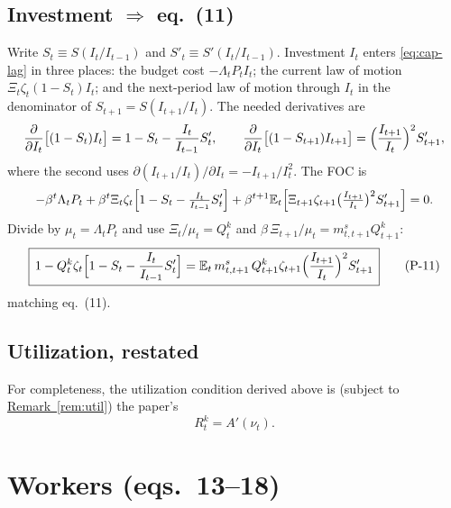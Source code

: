 \subsection{Investment \texorpdfstring{$\Rightarrow$}{=>} eq.\ (11)}
Write $S_t\equiv S(I_t/I_{t-1})$ and $S'_t\equiv S'(I_t/I_{t-1})$. Investment $I_t$ enters
\eqref{eq:cap-lag} in three places: the budget cost $-\Lambda_tP_tI_t$; the current law of motion
$\Xi_t\zeta_t(1-S_t)I_t$; and the next-period law of motion through $I_t$ in the denominator of
$S_{t+1}=S(I_{t+1}/I_t)$. The needed derivatives are
\[
\frac{\partial }{\partial I_t}\big[(1-S_t)I_t\big]=1-S_t-\frac{I_t}{I_{t-1}}S'_t,\qquad
\frac{\partial }{\partial I_t}\big[(1-S_{t+1})I_{t+1}\big]=\Big(\frac{I_{t+1}}{I_t}\Big)^2 S'_{t+1},
\]
where the second uses $\partial(I_{t+1}/I_t)/\partial I_t=-I_{t+1}/I_t^2$. The FOC is
\[
-\beta^t\Lambda_tP_t+\beta^t\Xi_t\zeta_t\Big[1-S_t-\tfrac{I_t}{I_{t-1}}S'_t\Big]
+\beta^{t+1}\mathbb{E}_t\Big[\Xi_{t+1}\zeta_{t+1}\big(\tfrac{I_{t+1}}{I_t}\big)^2 S'_{t+1}\Big]=0.
\]
Divide by $\mu_t=\Lambda_tP_t$ and use $\Xi_t/\mu_t=Q^k_t$ and $\beta\,\Xi_{t+1}/\mu_t=m^s_{t,t+1}Q^k_{t+1}$:
\begin{equation}\label{eq:11}
\boxed{\,1-Q^k_t\zeta_t\Big[1-S_t-\frac{I_t}{I_{t-1}}S'_t\Big]
=\mathbb{E}_t\,m^s_{t,t+1}\,Q^k_{t+1}\zeta_{t+1}\Big(\frac{I_{t+1}}{I_t}\Big)^2 S'_{t+1}\,}
\tag{P-11}
\end{equation}
matching eq.\ (11).

\subsection*{Utilization, restated}
For completeness, the utilization condition derived above is (subject to
\hyperref[rem:util]{Remark~\ref*{rem:util}}) the paper's
\begin{equation}\label{eq:12}
R^k_t=A'(\nu_t).\tag{P-12}
\end{equation}

\section{Workers (eqs.\ 13--18)}

